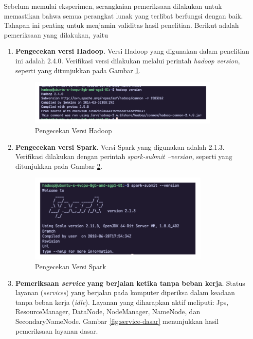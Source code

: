 Sebelum memulai eksperimen, serangkaian pemeriksaan dilakukan untuk memastikan bahwa semua perangkat lunak yang terlibat berfungsi dengan baik. Tahapan ini penting untuk menjamin validitas hasil penelitian. Berikut adalah pemeriksaan yang dilakukan, yaitu
\begin{enumerate}
	\item \textbf{Pengecekan versi Hadoop}. Versi Hadoop yang digunakan dalam penelitian ini adalah 2.4.0. Verifikasi versi dilakukan melalui perintah \textit{hadoop version}, seperti yang ditunjukkan pada Gambar \ref{fig:versi-hadoop}. 
		\begin{figure}[h]
		    \centering
		    \includegraphics[width=0.9\textwidth]{figures/ch04/versi-hadoop}
		    \caption{Pengecekan Versi Hadoop}
		    \label{fig:versi-hadoop}
		\end{figure}
	\item \textbf{Pengecekan versi Spark}. Versi Spark yang digunakan adalah 2.1.3. Verifikasi dilakukan dengan perintah \textit{spark-submit --version}, seperti yang ditunjukkan pada Gambar \ref{fig:versi-spark}.
		\begin{figure}[h]
		    \centering
		    \includegraphics[width=0.85\textwidth]{figures/ch04/versi-spark}
		    \caption{Pengecekan Versi Spark}
		    \label{fig:versi-spark}
		\end{figure}
	\item \textbf{Pemeriksaan \textit{service} yang berjalan ketika tanpa beban kerja}. Status layanan (\textit{services}) yang berjalan pada komputer diperiksa dalam keadaan tanpa beban kerja (\textit{idle}). Layanan yang diharapkan aktif meliputi: Jps, ResourceManager, DataNode, NodeManager, NameNode, dan SecondaryNameNode. Gambar \ref{fig:service-dasar} menunjukkan hasil pemeriksaan layanan dasar.		

\end{enumerate}
